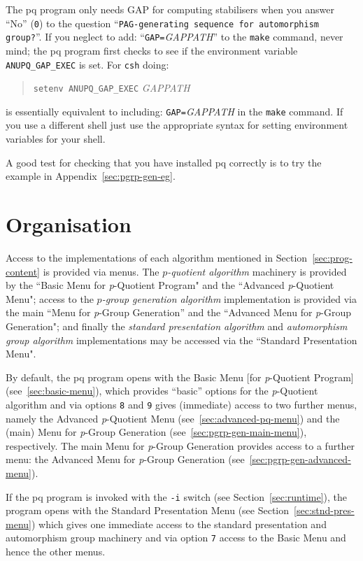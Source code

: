 \documentclass[12pt]{article}
\begin{document}
The pq program only needs {\sf GAP} for computing stabilisers when you
answer ``No'' (\texttt{0}) to the question 
``\texttt{PAG-generating sequence for automorphism group?}''.
If you neglect to add: ``\verb|GAP=|\textit{GAPPATH}'' to the \verb|make|
command, never mind; the pq program first checks to see if the environment
variable \verb|ANUPQ_GAP_EXEC| is set. For \texttt{csh} doing:

\begin{quote}
\verb|setenv ANUPQ_GAP_EXEC| \textit{GAPPATH}
\end{quote}
%
is essentially equivalent to including: \verb|GAP=|\textit{GAPPATH}
in the \verb|make| command. If you use a different shell just use the
appropriate syntax for setting environment variables for your shell.

A good test for checking that you have installed pq correctly is to try
the example in Appendix~\ref{sec:pgrp-gen-eg}.

\section{Organisation}
Access to the implementations of each algorithm mentioned in
Section~\ref{sec:prog-content} is provided via menus. 
The \emph{$p$-quotient algorithm} machinery is provided by the
``Basic Menu for {\it p}-Quotient Program" and
the ``Advanced {\it p}-Quotient Menu";
access to the \emph{$p$-group generation algorithm} implementation is
provided via the main ``Menu for {\it p}-Group Generation'' and the
``Advanced Menu for {\it p}-Group Generation"; and finally the
\emph{standard presentation algorithm} and \emph{automorphism group algorithm}
implementations may be accessed via the ``Standard Presentation Menu".

By default, the pq program opens with the Basic Menu [for {\it p}-Quotient
Program] (see~\ref{sec:basic-menu}), which provides ``basic'' options for
the {\it p}-Quotient algorithm and via options \texttt{8} and \texttt{9}
gives (immediate) access to two further menus, 
namely the Advanced {\it p}-Quotient Menu 
(see~\ref{sec:advanced-pq-menu}) and the (main) 
Menu for {\it p}-Group Generation (see~\ref{sec:pgrp-gen-main-menu}),
respectively. The main Menu for {\it p}-Group Generation provides
access to a further menu: the Advanced Menu for {\it p}-Group Generation 
(see~\ref{sec:pgrp-gen-advanced-menu}).

If the pq program is invoked with the \texttt{-i} switch (see
Section~\ref{sec:runtime}), the program opens with the 
Standard Presentation Menu (see Section~\ref{sec:stnd-pres-menu}) 
which gives one immediate access to the 
standard presentation and automorphism group machinery
and via option \texttt{7} access to the Basic Menu
and hence the other menus.
\end{document}

